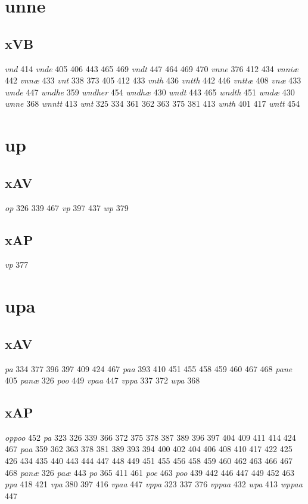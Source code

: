 \documentclass[a4paper,twocolumn]{article}
\begin{document}
\section{unne}
\label{sec:org4e86549}
\subsection{xVB}
\label{sec:org0d99224}
\emph{vnd} 414 \emph{vnde} 405 406 443 465 469 \emph{vndt} 447 464 469 470 \emph{vnne} 376 412 434 \emph{vnniæ} 442 \emph{vnnæ} 433 \emph{vnt} 338 373 405 412 433 \emph{vnth} 436 \emph{vntth} 442 446 \emph{vnttæ} 408 \emph{vnæ} 433 \emph{wnde} 447 \emph{wndhe} 359 \emph{wndher} 454 \emph{wndhæ} 430 \emph{wndt} 443 465 \emph{wndth} 451 \emph{wndæ} 430 \emph{wnne} 368 \emph{wnntt} 413 \emph{wnt} 325 334 361 362 363 375 381 413 \emph{wnth} 401 417 \emph{wntt} 454 
\section{up}
\label{sec:org3ace1a7}
\subsection{xAV}
\label{sec:orgeebd707}
\emph{op} 326 339 467 \emph{vp} 397 437 \emph{wp} 379 
\subsection{xAP}
\label{sec:org4e75f7c}
\emph{vp} 377 
\section{upa}
\label{sec:orgc5dc1f7}
\subsection{xAV}
\label{sec:orgc4e1509}
\emph{pa} 334 377 396 397 409 424 467 \emph{paa} 393 410 451 455 458 459 460 467 468 \emph{pane} 405 \emph{panæ} 326 \emph{poo} 449 \emph{vpaa} 447 \emph{vppa} 337 372 \emph{wpa} 368 
\subsection{xAP}
\label{sec:org0887404}
\emph{oppoo} 452 \emph{pa} 323 326 339 366 372 375 378 387 389 396 397 404 409 411 414 424 467 \emph{paa} 359 362 363 378 381 389 393 394 400 402 404 406 408 410 417 422 425 426 434 435 440 443 444 447 448 449 451 455 456 458 459 460 462 463 466 467 468 \emph{panæ} 326 \emph{paæ} 443 \emph{po} 365 411 461 \emph{poe} 463 \emph{poo} 439 442 446 447 449 452 463 \emph{ppa} 418 421 \emph{vpa} 380 397 416 \emph{vpaa} 447 \emph{vppa} 323 337 376 \emph{vppaa} 432 \emph{wpa} 413 \emph{wppaa} 447 
\end{document}
